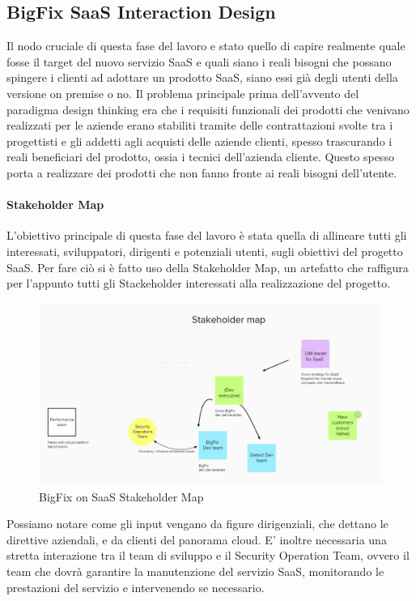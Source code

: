 \subsection{BigFix SaaS Interaction Design}
Il nodo cruciale di questa fase del lavoro e stato quello di capire realmente quale fosse il target del nuovo servizio SaaS e quali siano i reali bisogni che possano spingere i clienti ad adottare un prodotto SaaS, siano essi già degli utenti della versione on premise o no. Il problema principale prima dell'avvento del paradigma design thinking era che i requisiti funzionali dei prodotti che venivano realizzati per le aziende erano stabiliti tramite delle contrattazioni svolte tra i progettisti e gli addetti agli acquisti delle aziende clienti, spesso trascurando i reali beneficiari del prodotto, ossia i tecnici dell'azienda cliente. Questo spesso porta a realizzare dei prodotti che non fanno fronte ai reali bisogni dell'utente. 

\paragraph{Stakeholder Map}
L'obiettivo principale di questa fase del lavoro è stata quella di allineare tutti gli interessati, sviluppatori, dirigenti e potenziali utenti, sugli obiettivi del progetto SaaS. Per fare ciò si è fatto uso della Stakeholder Map, un artefatto che raffigura per l'appunto tutti gli Stackeholder interessati alla realizzazione del progetto. 
\begin{figure}[h!]
	\centering
	\includegraphics[width=\textwidth,keepaspectratio=true]{capitoli/imgs/StakeholderMap.PNG}
	\caption{BigFix on SaaS Stakeholder Map}
\end{figure}
Possiamo notare come gli input vengano da figure dirigenziali, che dettano le direttive aziendali, e da clienti del panorama cloud. E' inoltre necessaria una stretta interazione tra il team di sviluppo e il Security Operation Team, ovvero il team che dovrà garantire la manutenzione del servizio SaaS, monitorando le prestazioni del servizio e intervenendo se necessario.

